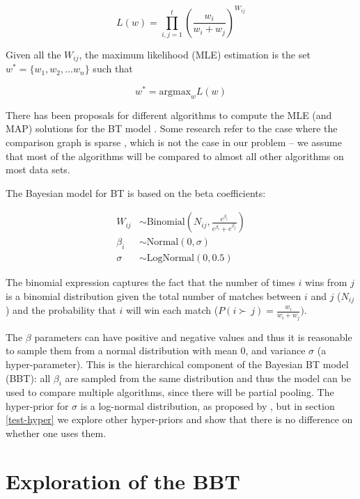 \documentclass[twoside,11pt,preprint]{article}
\begin{document}
\[L(w) = \prod_{i,j=1}^t (\frac{w_i}{w_i+w_j } )^{W_{ij} }\]

Given all the \(W_{ij}\), the maximum likelihood (MLE) estimation is the set \(w^* = \{w_1, w_2, \ldots w_n \}\) such that

\[w^* = \mbox{argmax}_w L(w)\]

There has been proposals for different algorithms to compute the MLE
(and MAP) solutions for the BT model
\citep{hunter2004mm, caron2012efficient}. Some research refer to the
case where the comparison graph is sparse \citep{li2021, butler2004},
which is not the case in our problem -- we assume that most of the
algorithms will be compared to almost all other algorithms on most
data sets.

The Bayesian model for BT is based on the beta coefficients:

\begin{align} 
 W_{ij} &\sim \mbox{Binomial}(N_{ij}, \frac{e^{\beta_i}}{e^{\beta_i} +  e^{\beta_j}}) \label{eq:mod1} \\
 \beta_i &\sim \mbox{Normal}(0,\sigma) \nonumber \\
 \sigma &\sim \mbox{LogNormal}(0,0.5) \nonumber
\end{align}

The binomial expression captures the fact that the number of times \(i\)
wins from \(j\) is a binomial distribution given the total number of
matches between \(i\) and \(j\) (\(N_{ij}\)) and the probability that \(i\)
will win each match (\(P(i \succ\,j) = \frac{w_i}{w_i+ w_j})\).

The \(\beta\) parameters can have positive and negative values and thus
it is reasonable to sample them from a normal distribution with mean
0, and variance \(\sigma\) (a hyper-parameter). This is the
hierarchical component of the Bayesian BT model (BBT): all \(\beta_i\)
are sampled from the same distribution and thus the model can be used
to compare multiple algorithms, since there will be partial pooling.
The hyper-prior for \(\sigma\) is a log-normal distribution, as proposed
by \citet{btstan}, but in section \ref{test-hyper} we explore other
hyper-priors and show that there is no difference on whether one uses
them.

\hypertarget{exploration-of-the-bbt}{%
\section{\texorpdfstring{Exploration of the BBT \label{sec:exp1}}{Exploration of the BBT }}\label{exploration-of-the-bbt}}
\end{document}
